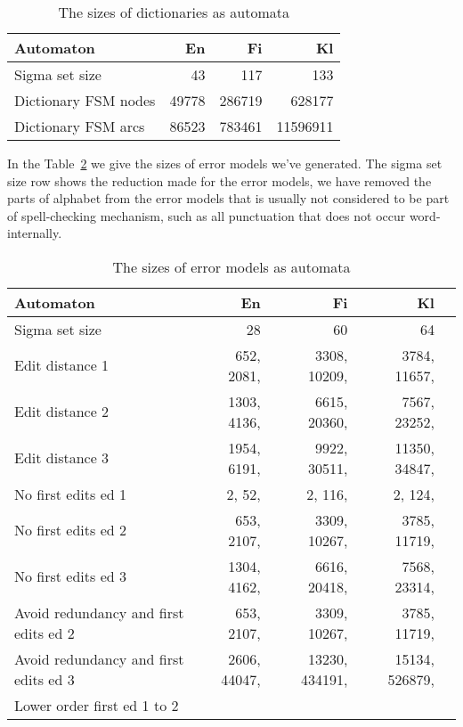 \documentclass[11pt]{article}
\begin{document}
\begin{table}[h]
\begin{center}
\begin{scriptsize}
\begin{tabular}{|l|rrr|}
\hline
\bf Automaton & \bf En & \bf Fi & \bf Kl  \\ 
\hline
Sigma set size &
 43& 117& 133
\\
Dictionary FSM nodes &
49778 & 286719 & 628177 \\
Dictionary FSM arcs & 
86523 & 783461 & 11596911 \\
\hline
\end{tabular}
\end{scriptsize}
\end{center}
\caption{\label{table:dictionary-sizes}
The sizes of dictionaries as automata}
\end{table}

In the Table~\ref{table:error-sizes} we give the sizes of error models we've
generated. The sigma set size row shows the reduction made for the error models,
we have removed the parts of alphabet from the error models that is usually not
considered to be part of spell-checking mechanism, such as all punctuation that
does not occur word-internally. 

\begin{table}[h]
\begin{center}
\begin{scriptsize}
\begin{tabular}{|l|rrrr|}
\hline
\bf Automaton & \bf En & \bf Fi & \bf Kl  \\ 
\hline
Sigma set size &
 28& 60& 64
\\
Edit distance 1 &
 652, 2081,& 3308, 10209,& 3784, 11657,
\\
Edit distance 2 &
 1303, 4136,& 6615, 20360,& 7567, 23252,
\\
Edit distance 3 &
 1954, 6191,& 9922, 30511,& 11350, 34847,
\\
No first edits ed 1 & 
 2, 52,& 2, 116,& 2, 124,
\\
No first edits ed 2 &
 653, 2107,& 3309, 10267,& 3785, 11719,
\\
No first edits ed 3 &
 1304, 4162,& 6616, 20418,& 7568, 23314,
\\
Avoid redundancy and first edits ed 2 &
 653, 2107,& 3309, 10267,& 3785, 11719,
\\
Avoid redundancy and first edits ed 3 &
 2606, 44047,& 13230, 434191,& 15134, 526879,
\\
Lower order first ed 1 to 2 &
&&
\\
\end{tabular}
\end{scriptsize}
\end{center}
\caption{\label{table:error-sizes}
The sizes of error models as automata}
\end{table}
\end{document}
